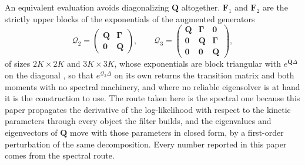 \begin{appendixbox}
An equivalent evaluation avoids diagonalizing $\mathbf{Q}$ altogether. $\mathbf{F}_1$ and
$\mathbf{F}_2$ are the strictly upper blocks of the exponentials of the augmented generators
\begin{equation}
  \mathcal{Q}_2=\begin{pmatrix}\mathbf{Q} & \bm{\Gamma}\\ \bm{0} & \mathbf{Q}\end{pmatrix},
  \qquad
  \mathcal{Q}_3=\begin{pmatrix}\mathbf{Q} & \bm{\Gamma} & \bm{0}\\
                               \bm{0} & \mathbf{Q} & \bm{\Gamma}\\
                               \bm{0} & \bm{0} & \mathbf{Q}\end{pmatrix},
  \label{eq:augmented}
\end{equation}
of sizes $2K\times 2K$ and $3K\times 3K$, whose exponentials are block triangular with
$e^{\mathbf{Q}\Delta}$ on the diagonal \citep{vanloan1978computing}, so that
$e^{\mathcal{Q}_3\Delta}$ on its own returns the transition matrix and both moments with no
spectral machinery, and where no reliable eigensolver is at hand it is the construction to
use. The route taken here is the spectral one because this paper propagates the derivative
of the log-likelihood with respect to the kinetic parameters through every object the
filter builds, and the eigenvalues and eigenvectors of $\mathbf{Q}$ move with those
parameters in closed form, by a first-order perturbation of the same decomposition. Every
number reported in this paper comes from the spectral route.

\end{appendixbox}
